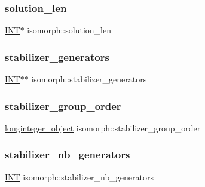 \subsubsection{\texorpdfstring{solution\+\_\+len}{solution\_len}}
{\footnotesize\ttfamily \mbox{\hyperlink{galois_8h_a09fddde158a3a20bd2dcadb609de11dc}{I\+NT}}$\ast$ isomorph\+::solution\+\_\+len}

\mbox{\label{classisomorph_a733d516edce93eb4532c06e17e849675}} 
\subsubsection{\texorpdfstring{stabilizer\+\_\+generators}{stabilizer\_generators}}
{\footnotesize\ttfamily \mbox{\hyperlink{galois_8h_a09fddde158a3a20bd2dcadb609de11dc}{I\+NT}}$\ast$$\ast$ isomorph\+::stabilizer\+\_\+generators}

\mbox{\label{classisomorph_a685064b9037f82e3fe0c810dcd3db619}} 
\subsubsection{\texorpdfstring{stabilizer\+\_\+group\+\_\+order}{stabilizer\_group\_order}}
{\footnotesize\ttfamily \mbox{\hyperlink{classlonginteger__object}{longinteger\+\_\+object}} isomorph\+::stabilizer\+\_\+group\+\_\+order}

\mbox{\label{classisomorph_a4a4109215d1a95059c4c3fc2cedfd6a9}} 
\subsubsection{\texorpdfstring{stabilizer\+\_\+nb\+\_\+generators}{stabilizer\_nb\_generators}}
{\footnotesize\ttfamily \mbox{\hyperlink{galois_8h_a09fddde158a3a20bd2dcadb609de11dc}{I\+NT}} isomorph\+::stabilizer\+\_\+nb\+\_\+generators}

